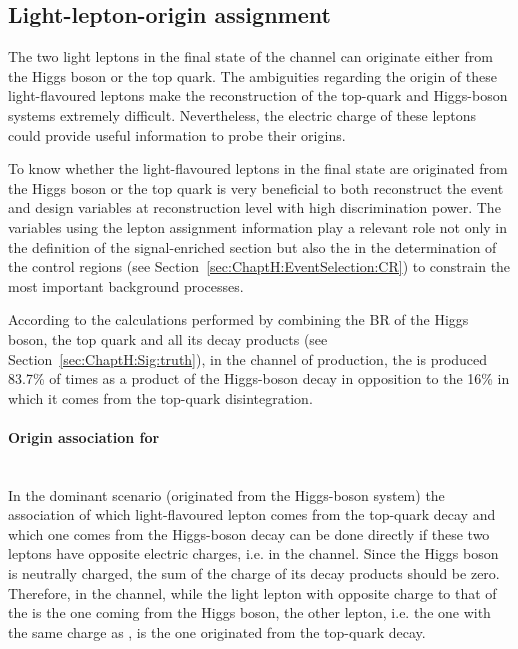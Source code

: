 

\subsection{Light-lepton-origin assignment}
\label{sec:ChaptH:Sig:LepAsign}
The two light leptons in the final state of the \dileptau channel can originate either from the 
Higgs boson or the top quark. The ambiguities regarding the origin of these light-flavoured
leptons make the reconstruction of the top-quark and Higgs-boson systems extremely difficult.
Nevertheless, the electric charge of these leptons could provide useful information to probe their origins.

To know whether the light-flavoured leptons in the final state are originated from
the Higgs boson or the top quark is very beneficial to both reconstruct the event and
design variables at reconstruction level with high discrimination power. %
The variables using the lepton assignment information play a relevant role not only in 
 the definition of the signal-enriched section but also the in the determination of 
 the control regions (see Section~\ref{sec:ChaptH:EventSelection:CR}) to constrain the most important background processes.

According to the calculations performed by combining the BR of the Higgs boson, the top quark 
and all its decay products (see Section~\ref{sec:ChaptH:Sig:truth}),
in the \dileptau channel of \tHq production, the \tauhad is produced 83.7\% of times as a 
product of the Higgs-boson decay in opposition to the 16\% in which it comes from the top-quark
disintegration. 

\paragraph{Origin association for \dilepOStau}\mbox{}\\ %
In the dominant scenario (\tauhad originated from the Higgs-boson system) the association of which light-flavoured
lepton comes from the top-quark decay and which one comes from the Higgs-boson decay can be
done directly if these two leptons have opposite electric charges, i.e. in the \dilepOStau channel.
Since the Higgs boson is neutrally charged, the sum of the charge of its decay products should be zero. Therefore,
in the \dilepOStau channel, while the light lepton with opposite charge to that of the \tauhad is the one coming
from the Higgs boson, the other lepton, i.e. the one with the same charge as \tauhad, is the one originated 
from the top-quark decay.




